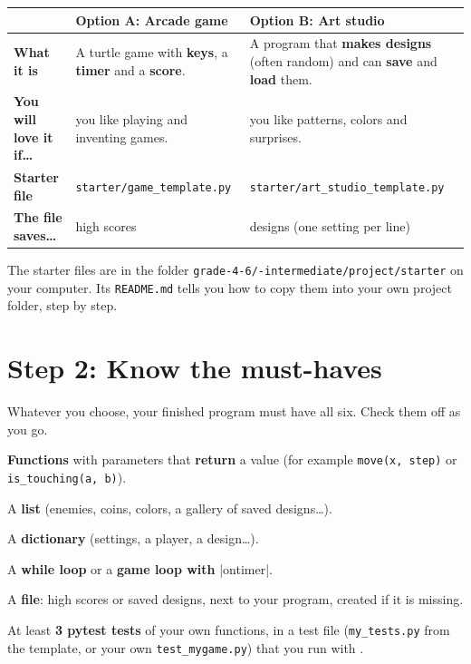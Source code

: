 \documentclass[level=2]{kidscode}
\begin{document}
\begin{center}
\end{center}

\begin{tabularx}{\linewidth}{@{}>{\bfseries}p{3.2cm}XX@{}}
\toprule
 & Option A: Arcade game & Option B: Art studio \\ \midrule
What it is & A turtle game with \textbf{keys}, a \textbf{timer} and a \textbf{score}. & A program that \textbf{makes designs} (often random) and can \textbf{save} and \textbf{load} them. \\
You will love it if\ldots & you like playing and inventing games. & you like patterns, colors and surprises. \\
Starter file & \texttt{starter/\allowbreak game\_template.py} & \texttt{starter/\allowbreak art\_studio\_template.py} \\
The file saves\ldots & high scores & designs (one setting per line) \\
\bottomrule
\end{tabularx}

\noindent The starter files are in the folder \texttt{grade-4-6/-intermediate/\allowbreak project/\allowbreak starter} on your computer.
Its \texttt{README.md} tells you how to copy them into your own project folder, step by step.

\section{Step 2: Know the must-haves}
Whatever you choose, your finished program must have all six. Check them off as you go.
\begin{checklist}
  \item \textbf{Functions} with parameters that \textbf{return} a value (for example \texttt{move(x, step)} or \texttt{is\_touching(a, b)}).
  \item A \textbf{list} (enemies, coins, colors, a gallery of saved designs\ldots).
  \item A \textbf{dictionary} (settings, a player, a design\ldots).
  \item A \textbf{while loop} or a \textbf{game loop with} \py|ontimer|.
  \item A \textbf{file}: high scores or saved designs, next to your program, created if it is missing.
  \item At least \textbf{3 pytest tests} of your own functions, in a test file (\texttt{my\_tests.py} from the
        template, or your own \texttt{test\_mygame.py}) that you run with .
\end{checklist}
\end{document}
